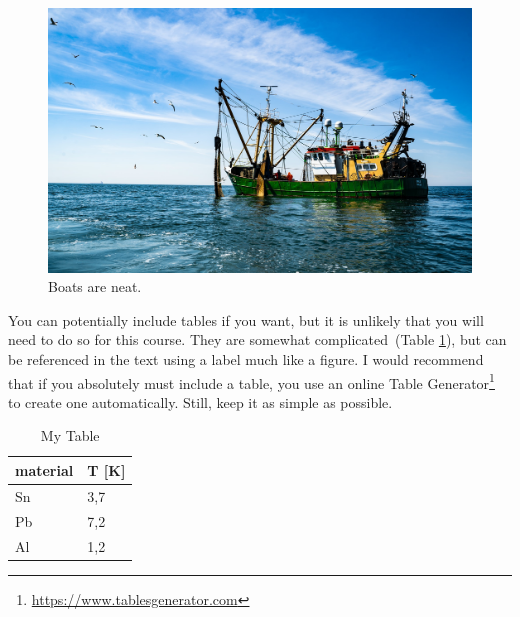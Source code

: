 \documentclass[12pt,man,hidelinks]{apa7}
\begin{document}
\begin{figure}
\centering
\includegraphics[width=0.75\linewidth]{img/trawler.jpg}
\caption{Boats are neat.}
\label{fig:boat}
\end{figure}

You can potentially include tables if you want, but it is unlikely that you will need to do so for this course. They are somewhat complicated~(Table \ref{Tab:Tcr}), but can be referenced in the text using a label much like a figure. I would recommend that if you absolutely must include a table, you use an online Table Generator\footnote{\url{https://www.tablesgenerator.com}} to create one automatically. Still, keep it as simple as possible.

\begin{table}[ht]
\caption{My Table}
\centering
  \begin{tabular}{l l}
    material  & T [K]\\
    \hline
    Sn                     & 3,7 \\
    Pb                     & 7,2 \\
    Al                     & 1,2\\
  \end{tabular}
  \label{Tab:Tcr}
\end{table}


\printbibliography

% 
% 
\end{document}
